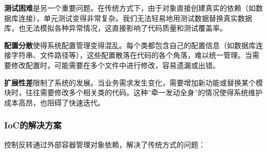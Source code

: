 \textbf{测试困难}是另一个重要问题。在传统方式下，由于对象直接创建真实的依赖（如数据库连接），单元测试变得非常复杂。我们无法轻易地用测试数据替换真实数据库，也无法模拟各种异常情况，这直接影响了代码质量和测试覆盖率。

\textbf{配置分散}使得系统配置管理变得混乱。每个类都包含自己的配置信息（如数据库连接字符串、文件路径等），这些配置散落在代码的各个角落，难以统一管理。当需要修改配置时，可能需要在多个文件中进行修改，容易遗漏或出错。

\textbf{扩展性差}限制了系统的发展。当业务需求发生变化，需要增加新功能或替换某个模块时，往往需要修改多个相关类的代码。这种''牵一发动全身''的情况使得系统维护成本高昂，也阻碍了快速迭代。

\subsubsection{IoC的解决方案}\label{iocux7684ux89e3ux51b3ux65b9ux6848}

控制反转通过外部容器管理对象依赖，解决了传统方式的问题：

\begin{Shaded}
\begin{Highlighting}[]
 \OperatorTok{\{}
    
     \OperatorTok{;}
     \OperatorTok{;}
    
     \OperatorTok{(}\OperatorTok{,}\OperatorTok{)} \OperatorTok{\{}
         \OperatorTok{=}\OperatorTok{;}
         \OperatorTok{=}\OperatorTok{;}
    \OperatorTok{\}}
    
    \OperatorTok{(}\OperatorTok{)} \OperatorTok{\{}
        \OperatorTok{(}\OperatorTok{,}\OperatorTok{);}
    \OperatorTok{\}}
\OperatorTok{\}}
\end{Highlighting}
\end{Shaded}

